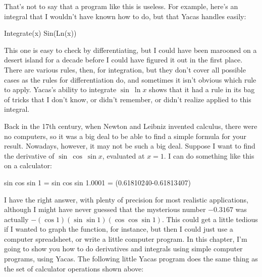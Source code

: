 That's not to say that a program like this is useless. For example, here's an integral
that I wouldn't have known how to do, but that Yacas handles easily:

\restartLineNumbers
\begin{eg}
\startcodeeg
\begin{Code}
  \ii Integrate(x) Sin(Ln(x))
\end{Code}
\finishcodeeg
\end{eg}

This one is easy to check by differentiating, but I could have been marooned on a
desert island for a decade before I could have figured it out in the first place.
There are various rules, then, for integration, but they don't cover all possible
cases as the rules for differentiation do, and sometimes it isn't obvious
which rule to apply. Yacas's ability to integrate $\sin\:\ln x$ shows that it
had a rule in its bag of tricks that I don't know, or didn't remember, or didn't realize
applied to this integral.

Back in the 17th century, when Newton and Leibniz invented calculus, there were no
computers, so it was a big deal to be able to find a simple formula for your result.
Nowadays, however, it may not be such a big deal. Suppose I want to find the derivative
of $\sin\:\cos\:\sin x$, evaluated at $x=1$. I can do something like this on a calculator:

\restartLineNumbers
\begin{eg}
\startcodeeg
\begin{Code}
  \ii sin cos sin 1 =  
  \ii sin cos sin 1.0001 =
  \ii(0.61810240-0.61813407) 
\end{Code}
\finishcodeeg
\end{eg}

I have the right answer, with plenty of precision for most realistic applications,
although I might have never guessed that the mysterious number $-0.3167$ was
actually $-(\cos 1)(\sin\sin 1)(\cos\cos\sin 1)$. This could get a little tedious if I wanted to graph the function,
for instance, but then I could just use a computer spreadsheet, or write a little
computer program. In this chapter, I'm going to show you how to do derivatives
and integrals using simple computer programs, using Yacas.
The following little Yacas program does the same thing as the set of calculator
operations shown above:

